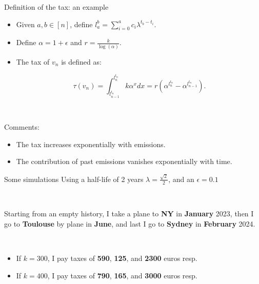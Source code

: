\documentclass[french, english]{beamer}
\begin{document}
\begin{frame}{Definition of the tax: an example}
    \begin{itemize}
    \item Given $a,b \in [n]$, define $l_a^{b} = \sum_{i = 0}^a c_i \lambda^{t_b - t_i}$.
    \item Define $\alpha = 1 + \epsilon$ and $r = \frac{k}{\log(\alpha)}$.
    \item The tax of $v_n$ is defined as: \begin{tcolorbox}$$ \tau(v_n) = \int_{l_{n-1}^{t_n}}^{l_n^{t_n}} k \alpha^x dx = r (\alpha^{l_n^{t_n}} - \alpha^{l_{n - 1}^{t_n}}).$$\end{tcolorbox}
    \end{itemize}	
    
    \

   Comments:
   \begin{itemize}
   \item The tax increases exponentially with emissions.
   \item The contribution of past emissions vanishes exponentially with time.
   \end{itemize}

\end{frame}

\begin{frame}{Some simulations}
    Using a half-life of 2 years $\lambda = \frac{\sqrt{2}}{2}$, and an $\epsilon = 0.1$
    
    \
    
    Starting from an empty history, I take a plane to \textbf{NY} in \textbf{January} 2023, then I go to \textbf{Toulouse} by plane in \textbf{June}, and  last I go to \textbf{Sydney} in \textbf{February} 2024. 
    
    \
    
    \begin{itemize}
    \item If $k=300$, I pay taxes of \textbf{590}, \textbf{125}, and \textbf{2300} euros resp.
    \item If $k=400$, I pay taxes of \textbf{790}, \textbf{165}, and \textbf{3000} euros resp. 
    \end{itemize}
\end{frame}
\end{document}
